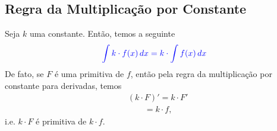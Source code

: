 \subsection{Regra da Multiplicação por Constante}

Seja $k$ uma constante. Então, temos a seguinte 
\begin{equation}\label{eq:regra_mult_por_const}\color{blue}\int k\cdot f(x)\,dx = k\cdot \int f(x)\,dx
\end{equation}
De fato, se $F$ é uma primitiva de $f$, então pela regra da multiplicação por constante para derivadas, temos
\begin{align}
  & (k\cdot F)' = k\cdot F'\\
  &\text{}\qquad = k\cdot f,
\end{align}
i.e. $k\cdot F$ é primitiva de $k\cdot f$.


